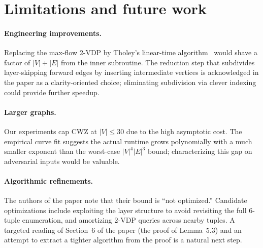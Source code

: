 \section{Limitations and future work}

\paragraph{Engineering improvements.} Replacing the max-flow 2-VDP by
Tholey's linear-time algorithm~\cite{Tholey2012} would shave a factor of
$|V|+|E|$ from the inner subroutine. The reduction step that subdivides
layer-skipping forward edges by inserting intermediate vertices is
acknowledged in the paper as a clarity-oriented choice; eliminating
subdivision via clever indexing could provide further speedup.

\paragraph{Larger graphs.} Our experiments cap CWZ at $|V|\le 30$ due to
the high asymptotic cost. The empirical curve fit suggests the actual
runtime grows polynomially with a much smaller exponent than the
worst-case $|V|^{4}|E|^{3}$ bound; characterizing this gap on adversarial
inputs would be valuable.

\paragraph{Algorithmic refinements.} The authors of the paper note that
their bound is ``not optimized.'' Candidate optimizations include exploiting
the layer structure to avoid revisiting the full $6$-tuple enumeration, and
amortizing 2-VDP queries across nearby tuples. A targeted reading of
Section~6 of the paper (the proof of Lemma~5.3) and an attempt to extract a
tighter algorithm from the proof is a natural next step.





